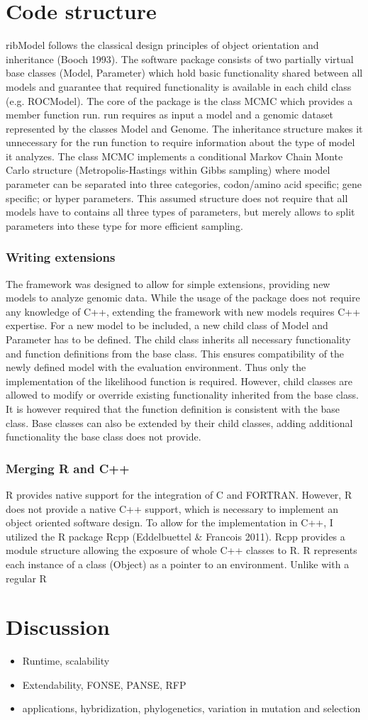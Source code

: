 \documentclass[12pt,draft]{article}
\begin{document}
\section{Code structure}
ribModel follows the classical design principles of object orientation and inheritance
(Booch 1993). The software package consists of two partially virtual base
classes (Model, Parameter) which hold basic functionality shared between all
models and guarantee that required functionality is available in each
child class (e.g. ROCModel).
The core of the package is the class MCMC which provides a member function
run. run requires as input a model and a genomic dataset represented by the
classes Model and Genome. The inheritance structure makes it unnecessary for
the run function to require information about the type of model it analyzes.
The class MCMC implements a conditional Markov Chain Monte Carlo structure
(Metropolis-Hastings within Gibbs sampling) where model parameter can be
separated into three categories, codon/amino acid specific; gene specific; or hyper
parameters. This assumed structure does not require that all models have to
contains all three types of parameters, but merely allows to split parameters into
these type for more efficient sampling.
\subsubsection{Writing extensions}
The framework was designed to allow for simple extensions, providing new models
to analyze genomic data. While the usage of the package does not require
any knowledge of C++, extending the framework with new models requires C++
expertise. For a new model to be included, a new child class of Model and Parameter
has to be defined. The child class inherits all necessary functionality and
function definitions from the base class. This ensures compatibility of the newly
defined model with the evaluation environment. Thus only the implementation of
the likelihood function is required. However, child classes are allowed to modify or
override existing functionality inherited from the base class. It is however required
that the function definition is consistent with the base class. Base classes can also
be extended by their child classes, adding additional functionality the base class
does not provide.
\subsubsection{Merging R and C++}
R provides native support for the integration of C and FORTRAN. However, R
does not provide a native C++ support, which is necessary to implement an object
oriented software design. To allow for the implementation in C++, I utilized the R
package Rcpp (Eddelbuettel & Francois 2011). Rcpp provides a module structure
allowing the exposure of whole C++ classes to R. R represents each instance
of a class (Object) as a pointer to an environment. Unlike with a regular R

\section*{Discussion}
\begin{itemize}
\item Runtime, scalability
\item Extendability, FONSE, PANSE, RFP
\item applications, hybridization, phylogenetics, variation in mutation and selection
\end{itemize}
\end{document}
